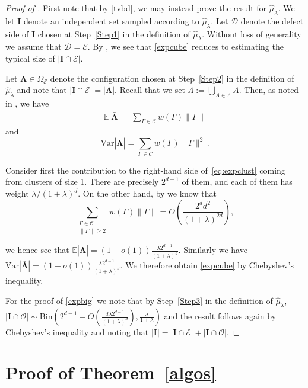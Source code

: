 \documentclass[a4paper]{amsart}
\theoremstyle{definition}
\newcommand{\cO}{\mathcal{O} }
\newcommand{\cC}{\mathcal{C} }
\newcommand{\cD}{\mathcal{D} }
\newcommand{\cE}{\mathcal{E} }
\newcommand{\nin}[0]{\noindent}
\newcommand{\0}[0]{\emptyset}
\newcommand{\lam}{\lambda}
\begin{document}
\begin{proof}[Proof of ]
    First note that by \eqref{tvbd}, we may instead prove the result for $\hat\mu_\lam$. We let $\mathbf{I}$ denote an independent set sampled according to $\hat\mu_\lam$. Let $\cD$ denote the defect side of $\mathbf{I}$ chosen at Step~\ref{Step1} in the definition of $\hat\mu_\lam$. Without loss of generality we assume that $\cD=\cE$.
By , we see that \eqref{expcube} reduces to estimating the typical size of $|\mathbf{I}\cap \cE|$. 

Let $\mathbf{\Lambda}\in \Omega_\cE$ denote the  configuration chosen at Step~\ref{Step2} in the definition of $\hat\mu_\lam$ and note that $|\mathbf{I}\cap \cE|= |\mathbf{\Lambda}|$. Recall that we set $\bar\Lambda:=\bigcup_{A\in\Lambda}A$. Then, as noted in \cite{struct}, we have
\begin{align} \label{eq:expclust}
\mathbb{E} |\mathbf{\mathbf{\bar \Lambda}}| = \sum_{\Gamma\in \cC} w(\Gamma)\|\Gamma\| 
\end{align}
and
\[ \text{Var} |\mathbf{\bar \Lambda}| = \sum_{\Gamma\in\cC} w(\Gamma) \|\Gamma\|^2\, . \]

Consider first the contribution to the right-hand side of~\eqref{eq:expclust} coming from clusters of size 1. There are precisely $2^{d-1}$ of them, and each of them has weight $\lam/(1+\lam)^d$.    On the other hand, by  we know that
\[ \sum_{\substack{\Gamma\in\cC \\ \|\Gamma\|\geq 2}} w(\Gamma)\|\Gamma\| =O\left(\frac{2^d d^2}{(1+\lam)^{2d}} \right),\]

\nin    we hence see that $\mathbb{E} |\mathbf{\bar \Lambda}| = (1+o(1))\frac{\lam 2^{d-1}}{(1+\lam)^d}$. Similarly we have $\text{Var} |\mathbf{\bar \Lambda}| = (1+o(1))\frac{\lam 2^{d-1}}{(1+\lam)^d}$.
      We therefore obtain \eqref{expcube} by Chebyshev's inequality.
    
    For the proof of \eqref{expbig} we note that by Step~\ref{Step3} in the definition of $\hat\mu_\lam$,  $|\mathbf{I}\cap\cO|\sim\text{Bin}\left(2^{d-1}-O\left(\frac{d\lam 2^{d-1}}{(1+\lam)^d}\right), \frac{\lam}{1+\lam}\right)$ and the result follows again by Chebyshev's inequality and noting that $|\mathbf{I}|=|\mathbf{I} \cap \cE|+|\mathbf{I}\cap \cO|$.
\end{proof}

\section{Proof of Theorem~\ref{algos}}\label{pfthmalgos}
\end{document}
